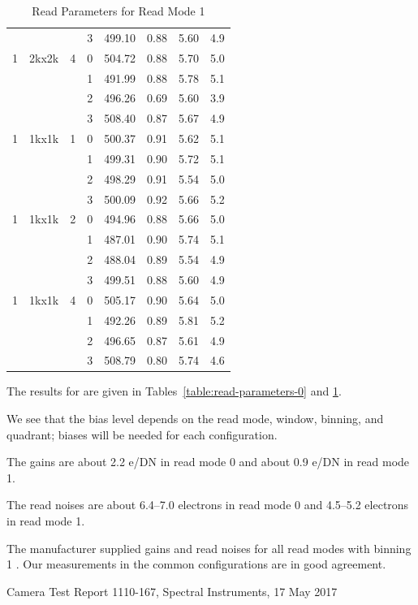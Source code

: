 \documentclass{article}
\newcommand{\code}[1]{{\ttfamily #1}}
\begin{document}
\begin{table}
\begin{center}
\begin{tabular}{cccccccc}
&&&3& 499.10& 0.88& 5.60& 4.9\\
1&\code{2kx2k}&4
  &0& 504.72& 0.88& 5.70& 5.0\\
&&&1& 491.99& 0.88& 5.78& 5.1\\
&&&2& 496.26& 0.69& 5.60& 3.9\\
&&&3& 508.40& 0.87& 5.67& 4.9\\
\hline
1&\code{1kx1k}&1
  &0& 500.37& 0.91& 5.62& 5.1\\
&&&1& 499.31& 0.90& 5.72& 5.1\\
&&&2& 498.29& 0.91& 5.54& 5.0\\
&&&3& 500.09& 0.92& 5.66& 5.2\\
1&\code{1kx1k}&2
  &0& 494.96& 0.88& 5.66& 5.0\\
&&&1& 487.01& 0.90& 5.74& 5.1\\
&&&2& 488.04& 0.89& 5.54& 4.9\\
&&&3& 499.51& 0.88& 5.60& 4.9\\
1&\code{1kx1k}&4
  &0& 505.17& 0.90& 5.64& 5.0\\
&&&1& 492.26& 0.89& 5.81& 5.2\\
&&&2& 496.65& 0.87& 5.61& 4.9\\
&&&3& 508.79& 0.80& 5.74& 4.6\\
\hline
\end{tabular}
\end{center}
\caption{Read Parameters for Read Mode 1}
\label{table:read-parameters-1}
\end{table}

The results for are given in Tables~\ref{table:read-parameters-0} and \ref{table:read-parameters-1}.

We see that the bias level depends on the read mode, window, binning, and quadrant; biases will be needed for each configuration.

The gains are about 2.2 e/DN in read mode 0 and about 0.9 e/DN in read mode 1.

The read noises are about 6.4--7.0 electrons in read mode 0 and 4.5--5.2 electrons in read mode 1.

The manufacturer supplied gains and read noises for all read modes with binning 1 \cite{camera-test-report}. Our measurements in the common configurations are in good agreement.

\begin{thebibliography}{1}
 Camera Test Report 1110-167, Spectral Instruments, 17 May 2017
\end{thebibliography}
\end{document}
